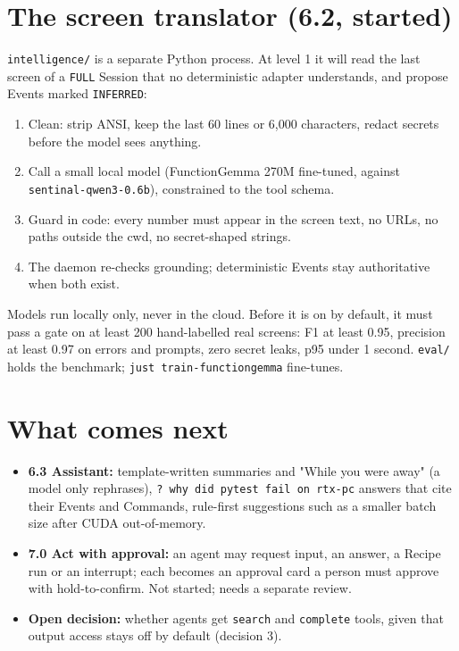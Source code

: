 \section{\texorpdfstring{The screen translator (6.2, started)}{The screen translator (6.2, started)}}

\texttt{intelligence/\allowbreak{}} is a separate Python process. At level 1 it will read the last screen of a \texttt{FULL} Session that no deterministic adapter understands, and propose Events marked \texttt{INFERRED}:

\begin{enumerate}
\item Clean: strip ANSI, keep the last 60 lines or 6,000 characters, redact secrets before the model sees anything.
\item Call a small local model (FunctionGemma 270M fine-tuned, against \texttt{sentinal-{}\allowbreak{}qwen3-{}\allowbreak{}0.\allowbreak{}6b}), constrained to the tool schema.
\item Guard in code: every number must appear in the screen text, no URLs, no paths outside the cwd, no secret-shaped strings.
\item The daemon re-checks grounding; deterministic Events stay authoritative when both exist.
\end{enumerate}

Models run locally only, never in the cloud. Before it is on by default, it must pass a gate on at least 200 hand-labelled real screens: F1 at least 0.95, precision at least 0.97 on errors and prompts, zero secret leaks, p95 under 1 second. \texttt{eval/\allowbreak{}} holds the benchmark; \texttt{just\ train-{}\allowbreak{}functiongemma} fine-tunes.

\section{\texorpdfstring{What comes next}{What comes next}}

\begin{itemize}
\item \textbf{6.3 Assistant:} template-written summaries and "While you were away" (a model only rephrases), \texttt{?\ why\ did\ pytest\ fail\ on\ rtx-{}\allowbreak{}pc} answers that cite their Events and Commands, rule-first suggestions such as a smaller batch size after CUDA out-of-memory.
\item \textbf{7.0 Act with approval:} an agent may request input, an answer, a Recipe run or an interrupt; each becomes an approval card a person must approve with hold-to-confirm. Not started; needs a separate review.
\item \textbf{Open decision:} whether agents get \texttt{search} and \texttt{complete} tools, given that output access stays off by default (decision 3).
\end{itemize}

